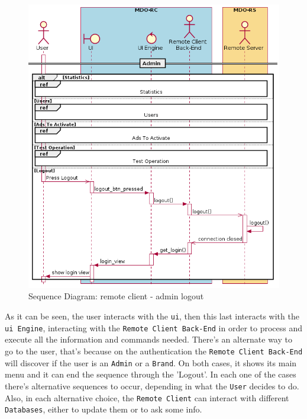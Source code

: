 \begin{figure}[htb!]
\centering
    \includegraphics[width=0.7\columnwidth]{./img/seq-rc-admin-logout.png}
  \caption{Sequence Diagram: remote client - admin logout}%
\label{fig:seq-rc-admin-logout}
\end{figure}

As it can be seen, the user interacts with the \texttt{\gls{ui}}, then this last interacts with the \texttt{\gls{ui} Engine}, interacting with the \texttt{Remote Client Back-End} in order to process and execute all the information and commands needed. 
There's an alternate way to go to the user, that's because on the authentication the \texttt{Remote Client Back-End} will discover if the user is an \texttt{Admin} or a \texttt{Brand}.
On both cases, it shows its main menu and it can end the sequence through the 'Logout'.
In each one of the cases there's alternative sequences to occur, depending in what the \texttt{User} decides to do.
Also, in each alternative choice, the \texttt{Remote Client} can interact with different \texttt{Databases}, either to update them or to ask some info.

